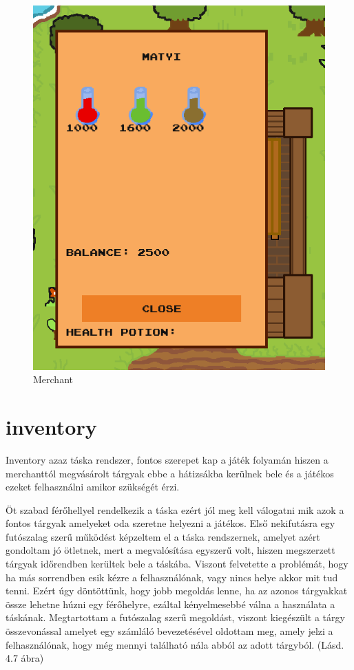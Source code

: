 \begin{figure}[H]
    \centering
    \includegraphics[width=9.0truecm]{images/merchant.png}
    \caption{Merchant}
    \label{fig:Merchant}
\end{figure}


\section{inventory}

Inventory azaz táska rendszer, fontos szerepet kap a játék folyamán hiszen a merchanttól megvásárolt tárgyak ebbe a hátizsákba kerülnek bele és a játékos ezeket felhasználni amikor szükségét érzi.

Öt szabad férőhellyel rendelkezik a táska ezért jól meg kell válogatni mik azok a fontos tárgyak amelyeket oda szeretne helyezni a játékos. Első nekifutásra egy futószalag szerű működést képzeltem el a táska rendszernek, amelyet azért gondoltam jó ötletnek, mert a megvalósítása egyszerű volt, hiszen megszerzett tárgyak időrendben kerültek bele a táskába. Viszont felvetette a problémát, hogy ha más sorrendben esik kézre a felhasználónak, vagy nincs helye akkor mit tud tenni. Ezért úgy döntöttünk, hogy jobb megoldás lenne, ha az azonos tárgyakkat össze lehetne húzni egy férőhelyre, ezáltal kényelmesebbé válna a használata a táskának. Megtartottam a futószalag szerű megoldást, viszont kiegészült a tárgy összevonással amelyet egy számláló bevezetésével oldottam meg, amely jelzi a felhasználónak, hogy még mennyi található nála abból az adott tárgyból. (Lásd. 4.7 ábra)

